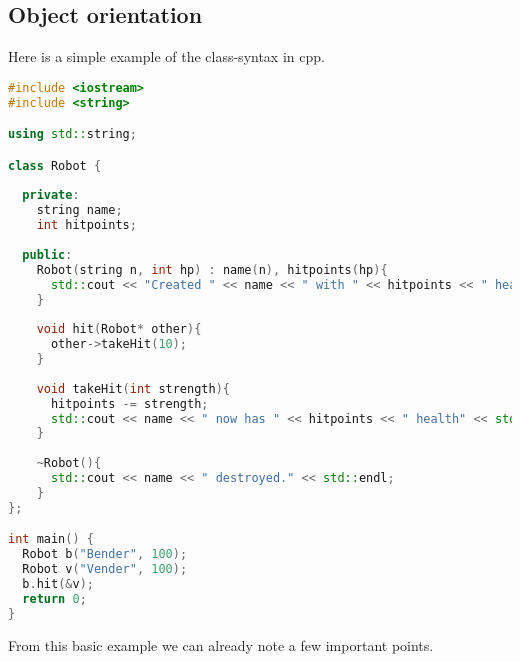 \subsection{Object orientation}
Here is a simple example of the class-syntax in cpp.

\begin{lstlisting}[language=c++]
#include <iostream>
#include <string>

using std::string;

class Robot {
  
  private:
    string name;
    int hitpoints;
  
  public:
    Robot(string n, int hp) : name(n), hitpoints(hp){
      std::cout << "Created " << name << " with " << hitpoints << " health" << std::endl;
    }
    
    void hit(Robot* other){
      other->takeHit(10);
    }
    
    void takeHit(int strength){
      hitpoints -= strength;
      std::cout << name << " now has " << hitpoints << " health" << std::endl;
    }
    
    ~Robot(){
      std::cout << name << " destroyed." << std::endl;
    }
};

int main() {
  Robot b("Bender", 100);
  Robot v("Vender", 100);
  b.hit(&v);
  return 0;
}
\end{lstlisting}

From this basic example we can already note a few important points.


